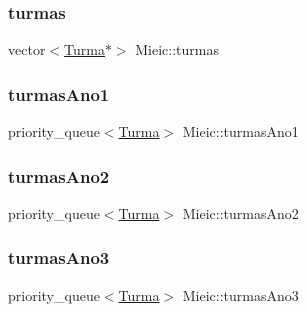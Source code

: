\hypertarget{class_mieic_a1066a7642990c43e6409a5bd0e93ebc6}{}\label{class_mieic_a1066a7642990c43e6409a5bd0e93ebc6} 
\subsubsection{\texorpdfstring{turmas}{turmas}}
{\footnotesize\ttfamily vector$<$\hyperlink{class_turma}{Turma}$\ast$$>$ Mieic\+::turmas\hspace{0.3cm}{\ttfamily [private]}}

\hypertarget{class_mieic_afcc92dc760be8d7dcaa8ff9241351917}{}\label{class_mieic_afcc92dc760be8d7dcaa8ff9241351917} 
\subsubsection{\texorpdfstring{turmas\+Ano1}{turmasAno1}}
{\footnotesize\ttfamily priority\+\_\+queue$<$\hyperlink{class_turma}{Turma}$>$ Mieic\+::turmas\+Ano1\hspace{0.3cm}{\ttfamily [private]}}

\hypertarget{class_mieic_adf5ce928562665eb89260ba4a6093c62}{}\label{class_mieic_adf5ce928562665eb89260ba4a6093c62} 
\subsubsection{\texorpdfstring{turmas\+Ano2}{turmasAno2}}
{\footnotesize\ttfamily priority\+\_\+queue$<$\hyperlink{class_turma}{Turma}$>$ Mieic\+::turmas\+Ano2\hspace{0.3cm}{\ttfamily [private]}}

\hypertarget{class_mieic_a8e4588349a5992556fec1d1d51772675}{}\label{class_mieic_a8e4588349a5992556fec1d1d51772675} 
\subsubsection{\texorpdfstring{turmas\+Ano3}{turmasAno3}}
{\footnotesize\ttfamily priority\+\_\+queue$<$\hyperlink{class_turma}{Turma}$>$ Mieic\+::turmas\+Ano3\hspace{0.3cm}{\ttfamily [private]}}

\hypertarget{class_mieic_a9de15327b80934561f2bf18538d0da99}{}\label{class_mieic_a9de15327b80934561f2bf18538d0da99} 
